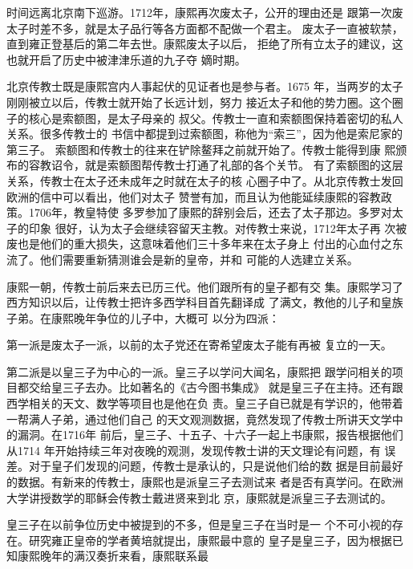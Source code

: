 时间远离北京南下巡游。1712年，康熙再次废太子，公开的理由还是%
跟第一次废太子时差不多，就是太子品行等各方面都不配做一个君主。%
废太子一直被软禁，直到雍正登基后的第二年去世。康熙废太子以后，%
拒绝了所有立太子的建议，这也就开启了历史中被津津乐道的九子夺%
嫡时期。%
\par
北京传教士既是康熙宫内人事起伏的见证者也是参与者。1675%
年，当两岁的太子刚刚被立以后，传教士就开始了长远计划，努力%
接近太子和他的势力圈。这个圈子的核心是索额图，是太子母亲的%
叔父。传教士一直和索额图保持着密切的私人关系。很多传教士的%
书信中都提到过索额图，称他为“索三”，因为他是索尼家的第三子。%
索额图和传教士的往来在铲除鳌拜之前就开始了。传教士能得到康%
熙颁布的容教诏令，就是索额图帮传教士打通了礼部的各个关节。%
有了索额图的这层关系，传教士在太子还未成年之时就在太子的核%
心圈子中了。从北京传教士发回欧洲的信中可以看出，他们对太子%
赞誉有加，而且认为他能延续康熙的容教政策。1706年，教皇特使%
多罗参加了康熙的辞别会后，还去了太子那边。多罗对太子的印象%
很好，认为太子会继续容留天主教。对传教士来说，1712年太子再%
次被废也是他们的重大损失，这意味着他们三十多年来在太子身上%
付出的心血付之东流了。他们需要重新猜测谁会是新的皇帝，并和%
可能的人选建立关系。%
\par
康熙一朝，传教士前后来去已历三代。他们跟所有的皇子都有交%
集。康熙学习了西方知识以后，让传教士把许多西学科目首先翻译成%
了满文，教他的儿子和皇族子弟。在康熙晚年争位的儿子中，大概可%
以分为四派：%
\par
第一派是废太子一派，以前的太子党还在寄希望废太子能有再被%
复立的一天。%
\par
第二派是以皇三子为中心的一派。皇三子以学问大闻名，康熙把%
跟学问相关的项目都交给皇三子去办。比如著名的《古今图书集成》%
就是皇三子在主持。还有跟西学相关的天文、数学等项目也是他在负%
责。皇三子自已就是有学识的，他带着一帮满人子弟，通过他们自己%
的天文观测数据，竟然发现了传教士所讲天文学中的漏洞。在1716年%
前后，皇三子、十五子、十六子一起上书康熙，报告根据他们从1714%
年开始持续三年对夜晚的观测，发现传教士讲的天文理论有问题，有%
误差。对于皇子们发现的问题，传教士是承认的，只是说他们给的数%
据是目前最好的数据。有新来的传教士，康熙也是派皇三子去测试来%
者是否有真学问。在欧洲大学讲授数学的耶稣会传教士戴进贤来到北%
京，康熙就是派皇三子去测试的。%
\par
皇三子在以前争位历史中被提到的不多，但是皇三子在当时是一%
个不可小视的存在。研究雍正皇帝的学者黄培就提出，康熙最中意的%
皇子是皇三子，因为根据已知康熙晚年的满汉奏折来看，康熙联系最%

